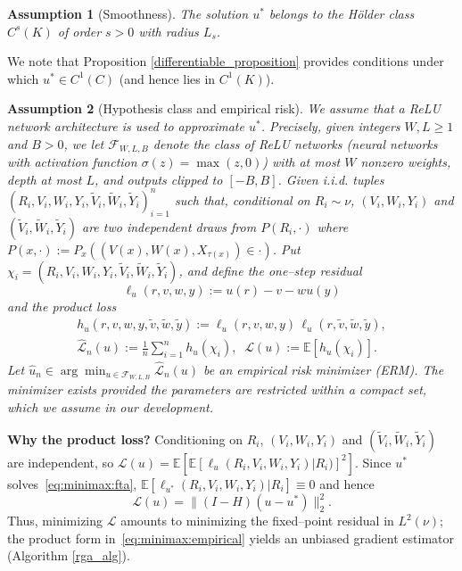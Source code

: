 \documentclass[pdflatex,sn-mathphys-ay]{sn-jnl}%
\numberwithin{equation}{section}
\theoremstyle{thmstyleone}%
\theoremstyle{thmstyletwo}%
\theoremstyle{thmstylethree}%
\newtheorem{assumption}{Assumption}
\begin{document}
\begin{assumption}[Smoothness]\label{assump:minimax:smooth}
The solution \(u^*\) belongs to the H\"older class \(C^s(K)\) of order \(s>0\) with radius \(L_s\).
\end{assumption}
We note that Proposition \ref{differentiable_proposition} provides conditions under which $u^*\in C^1(C)$ (and hence lies in $C^1(K)$).
\begin{assumption}[Hypothesis class and empirical risk]\label{assump:minimax:hyp}
We assume that a ReLU network architecture is used to approximate $u^*$. Precisely, given integers \(W,L\ge 1\) and \(B>0\), we let \(\mathcal{F}_{W,L,B}\) denote the class of ReLU networks (neural networks with activation function $\sigma(z)=\max(z,0)$) with at most \(W\) nonzero weights, depth at most \(L\), and outputs clipped to \([-B,B]\).  Given i.i.d. tuples \((R_i,V_i,W_i,Y_i,\tilde{V}_i,\tilde{W}_i,\tilde{Y}_i)_{i=1}^n\) such that, conditional on \(R_i\sim \nu\), $(V_i,W_i,Y_i)$ and $(\tilde{V}_i,\tilde{W}_i,\tilde{Y}_i)$ are two independent draws from \(P(R_i,\cdot)\) where $P(x,\cdot):=P_x((V(x),W(x),X_{\tau(x)})\in\cdot)$.
Put $\chi_i=(R_i,V_i,W_i,Y_i,\tilde{V}_i,\tilde{W}_i,\tilde{Y}_i)$, and define the one–step residual
\begin{equation*}
\ell_u(r,v,w,y):=u(r)-v-wu(y)
\end{equation*}
and the product loss
\begin{equation}\label{eq:minimax:empirical}
\begin{gathered}
h_u(r,v,w,y,\tilde{v},\tilde{w},\tilde{y}):=\ell_u(r,v,w,y)\,\ell_u(r,\tilde{v},\tilde{w},\tilde{y}),\\
\widehat{\mathcal{L}}_n(u):=\frac{1}{n}\sum_{i=1}^n h_u(\chi_i),\;\;\mathcal{L}(u):=\mathbb{E}[h_u(\chi_i)].
\end{gathered}
\end{equation}
Let \(\hat u_n\in\arg\min_{u\in\mathcal{F}_{W,L,B}}\widehat{\mathcal{L}}_n(u)\) be an empirical risk minimizer (ERM). The minimizer exists provided the parameters are restricted within a compact set, which we assume in our development. 
\end{assumption}
\textbf{Why the product loss?}  
Conditioning on \(R_i\), \((V_i,W_i,Y_i)\) and \((\tilde{V}_i,\tilde{W}_i,\tilde{Y}_i)\) are independent, so \(\mathcal{L}(u)=\mathbb{E}[\mathbb{E}[\ell_u(R_i,V_i,W_i,Y_i)|R_i)]^2]\).  Since \(u^*\) solves~\eqref{eq:minimax:fta}, \(\mathbb{E}[\ell_{u^*}(R_i,V_i,W_i,Y_i)|R_i]\equiv 0\) and hence
\begin{equation}\label{eq:minimax:risk-residual}
\mathcal{L}(u)=\|(I-H)(u-u^*)\|_2^2.
\end{equation}
Thus, minimizing \(\mathcal{L}\) amounts to minimizing the fixed–point residual in \(L^2(\nu)\); the product form in~\eqref{eq:minimax:empirical} yields an unbiased gradient estimator (Algorithm \ref{rga_alg}).
\end{document}
